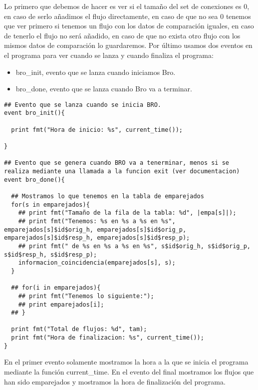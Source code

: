 Lo primero que debemos de hacer es ver si el tamaño del set de 
conexiones es 0, en caso de serlo añadimos el flujo directamente, 
en caso de que no sea 0 tenemos que ver primero si tenemos un flujo 
con los datos de comparación iguales, en caso de tenerlo el flujo 
no será añadido, en caso de que no exista otro flujo con los mismos 
datos de comparación lo guardaremos.
\intro
Por último usamos dos eventos en el programa para ver cuando se 
lanza y cuando finaliza el programa:
\intro
\begin{itemize}
\item bro\_init, evento que se lanza cuando iniciamos Bro.
\item bro\_done, evento que se lanza cuando Bro va a terminar.
\end{itemize}
\intro
\begin{lstlisting}[style=CodigoC]
## Evento que se lanza cuando se inicia BRO.
event bro_init(){

  print fmt("Hora de inicio: %s", current_time());

}

## Evento que se genera cuando BRO va a tenerminar, menos si se realiza mediante una llamada a la funcion exit (ver documentacion)
event bro_done(){

  ## Mostramos lo que tenemos en la tabla de emparejados
  for(s in emparejados){
    ## print fmt("Tamaño de la fila de la tabla: %d", |empa[s]|);
    ## print fmt("Tenemos: %s en %s a %s en %s", emparejados[s]$id$orig_h, emparejados[s]$id$orig_p, emparejados[s]$id$resp_h, emparejados[s]$id$resp_p);
    ## print fmt(" de %s en %s a %s en %s", s$id$orig_h, s$id$orig_p, s$id$resp_h, s$id$resp_p);
    informacion_coincidencia(emparejados[s], s);
  }

  ## for(i in emparejados){
    ## print fmt("Tenemos lo siguiente:");
    ## print emparejados[i];
  ## }

  print fmt("Total de flujos: %d", tam);
  print fmt("Hora de finalizacion: %s", current_time());
}
\end{lstlisting}

En el primer evento solamente mostramos la hora a la que se 
inicia el programa mediante la función current_time. En el 
evento del final mostramos los flujos que han sido emparejados 
y mostramos la hora de finalización del programa.
